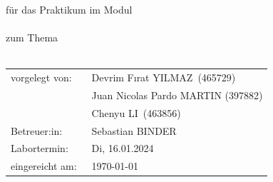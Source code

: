 %
%
%
%
%
\begin{titlepage}
\thispagestyle{scrheadings}
%
\setlength{\headheight}{103.0pt}

\chead[]{}
\ifoot[]{}
\cfoot[]{}
\ofoot[]{}
%
\noindent
\uni\\
\faculty\\
\institute\\
\department\\
%
\vspace{0.5cm}
\begin{center}
  \Large{\textbf{\textsc{\eventtype} \eventnumber}}\\[3.6ex]
  \Large{für das Praktikum im Modul}\\
  \Large{\textbf{\course}}\\[1.2ex]
  \Large{zum Thema}\\
  \Large{\textbf{\eventtopic}}\\[6.0ex]
  \normalsize
  \begin{tabular}{w{5.4cm}p{12cm}}%
    vorgelegt von:  & \quad \ Devrim Fırat YILMAZ\ (465729)\\[1.2ex]
                    & \quad \ Juan Nicolas Pardo MARTIN (397882)\\[1.2ex]
                    & \quad \ Chenyu LI\ (463856)\\[1.2ex] 

    Betreuer:in:    & \quad \ Sebastian BINDER\\[1.2ex] 
    Labortermin:    & \quad \ Di, 16.01.2024 \\[1.2ex]
    eingereicht am: & \quad \ \today
  \end{tabular}
\end{center}
%
\end{titlepage}
%
%
%